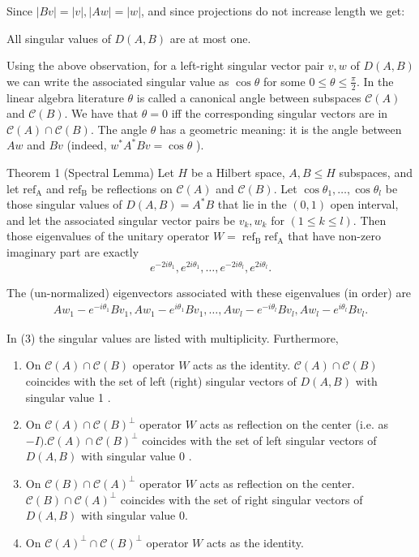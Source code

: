 Since $|B v|=|v|,|A w|=|w|$, and since projections do not increase length we get:

\begin{lemma}
	
 All singular values of $D(A, B)$ are at most one.\end{lemma}

Using the above observation, for a left-right singular vector pair $v, w$ of $D(A, B)$ we can write the associated singular value as $\cos \theta$ for some $0 \leq \theta \leq \frac{\pi}{2}$. In the linear algebra literature $\theta$ is called a canonical angle between subspaces $\mathcal{C}(A)$ and $\mathcal{C}(B)$. We have that $\theta=0$ iff the corresponding singular vectors are in $\mathcal{C}(A) \cap \mathcal{C}(B)$. The angle $\theta$ has a geometric meaning: it is the angle between $A w$ and $B v$ (indeed, $w^* A^* B v=\cos \theta$ ).
\begin{theorem}
	

Theorem 1 (Spectral Lemma) Let $H$ be a Hilbert space, $A, B \leq H$ subspaces, and let $\mathrm{ref}_{\mathrm{A}}$ and $\mathrm{ref}_{\mathrm{B}}$ be reflections on $\mathcal{C}(A)$ and $\mathcal{C}(B)$. Let $\cos \theta_1, \ldots, \cos \theta_l$ be those singular values of $D(A, B)=A^* B$ that lie in the $(0,1)$ open interval, and let the associated singular vector pairs be $v_k, w_k$ for $(1 \leq k \leq l)$. Then those eigenvalues of the unitary operator $W=\operatorname{ref}_{\mathrm{B}} \mathrm{ref}_{\mathrm{A}}$ that have non-zero imaginary part are exactly
$$
e^{-2 i \theta_1}, e^{2 i \theta_1}, \ldots, e^{-2 i \theta_l}, e^{2 i \theta_l} .
$$

The (un-normalized) eigenvectors associated with these eigenvalues (in order) are
$$
\begin{array}{r}
	A w_1-e^{-i \theta_1} B v_1, A w_1-e^{i \theta_1} B v_1, \ldots, 
	A w_l-e^{-i \theta_l} B v_l, A w_l-e^{i \theta_l} B v_l .
\end{array}
$$

In (3) the singular values are listed with multiplicity. Furthermore,
\begin{enumerate}
	

\item On $\mathcal{C}(A) \cap \mathcal{C}(B)$ operator $W$ acts as the identity. $\mathcal{C}(A) \cap \mathcal{C}(B)$ coincides with the set of left (right) singular vectors of $D(A, B)$ with singular value 1 .
\item On $\mathcal{C}(A) \cap \mathcal{C}(B)^{\perp}$ operator $W$ acts as reflection on the center (i.e. as $-I) . \mathcal{C}(A) \cap \mathcal{C}(B)^{\perp}$ coincides with the set of left singular vectors of $D(A, B)$ with singular value 0 .
\item On $\mathcal{C}(B) \cap \mathcal{C}(A)^{\perp}$ operator $W$ acts as reflection on the center. $\mathcal{C}(B) \cap \mathcal{C}(A)^{\perp}$ coincides with the set of right singular vectors of $D(A, B)$ with singular value 0.
\item On $\mathcal{C}(A)^{\perp} \cap \mathcal{C}(B)^{\perp}$ operator $W$ acts as the identity.
\end{enumerate}
\end{theorem}



